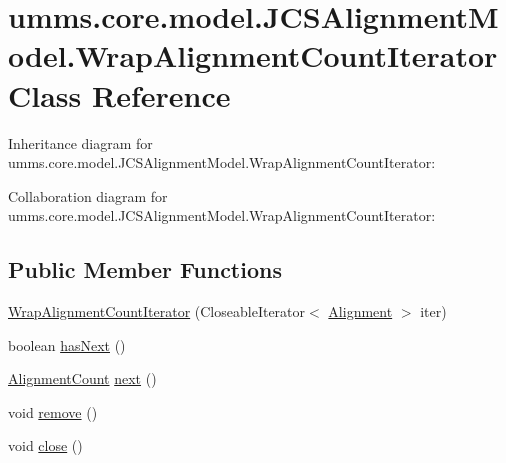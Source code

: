 \hypertarget{classumms_1_1core_1_1model_1_1_j_c_s_alignment_model_1_1_wrap_alignment_count_iterator}{\section{umms.\+core.\+model.\+J\+C\+S\+Alignment\+Model.\+Wrap\+Alignment\+Count\+Iterator Class Reference}
\label{classumms_1_1core_1_1model_1_1_j_c_s_alignment_model_1_1_wrap_alignment_count_iterator}
}


Inheritance diagram for umms.\+core.\+model.\+J\+C\+S\+Alignment\+Model.\+Wrap\+Alignment\+Count\+Iterator\+:


Collaboration diagram for umms.\+core.\+model.\+J\+C\+S\+Alignment\+Model.\+Wrap\+Alignment\+Count\+Iterator\+:
\subsection*{Public Member Functions}
\begin{DoxyCompactItemize}
\item 
\hyperlink{classumms_1_1core_1_1model_1_1_j_c_s_alignment_model_1_1_wrap_alignment_count_iterator_a37cb6e98b79d6454b1ed33c9025e98bf}{Wrap\+Alignment\+Count\+Iterator} (Closeable\+Iterator$<$ \hyperlink{interfaceumms_1_1core_1_1alignment_1_1_alignment}{Alignment} $>$ iter)
\item 
boolean \hyperlink{classumms_1_1core_1_1model_1_1_j_c_s_alignment_model_1_1_wrap_alignment_count_iterator_ab0d35d512d2bd4008a0469d53cb37aed}{has\+Next} ()
\item 
\hyperlink{classumms_1_1core_1_1model_1_1_j_c_s_alignment_model_1_1_alignment_count}{Alignment\+Count} \hyperlink{classumms_1_1core_1_1model_1_1_j_c_s_alignment_model_1_1_wrap_alignment_count_iterator_ac9cbacda3b09b1c3edd4adef54f61398}{next} ()
\item 
void \hyperlink{classumms_1_1core_1_1model_1_1_j_c_s_alignment_model_1_1_wrap_alignment_count_iterator_a8d6096bdb12141d32b281a9e202db042}{remove} ()
\item 
void \hyperlink{classumms_1_1core_1_1model_1_1_j_c_s_alignment_model_1_1_wrap_alignment_count_iterator_a1d56d25dd74c8dc82b8699dc2f954c31}{close} ()
\end{DoxyCompactItemize}


